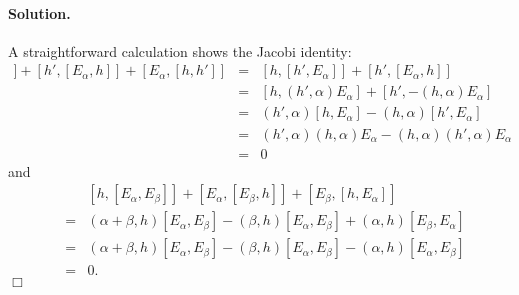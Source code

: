 \documentclass[11pt]{article}
\begin{document}
\paragraph{Solution.} A straightforward calculation shows the Jacobi identity:
\begin{eqnarray*}
[h, [h', E_\alpha]] + [h', [E_\alpha, h]] + [E_\alpha, [h, h']] 
&=& [h, [h', E_\alpha]] + [h', [E_\alpha, h]] \\
&=& [h, (h', \alpha) E_\alpha] + [h', -(h, \alpha) E_\alpha] \\
&=& (h', \alpha)[h, E_\alpha] - (h, \alpha) [h', E_\alpha] \\
&=& (h', \alpha)(h, \alpha) E_\alpha - (h, \alpha)(h', \alpha) E_\alpha \\
&=& 0
\end{eqnarray*}
and
\begin{eqnarray*}
&& [h, [E_\alpha, E_{\beta} ] ] + [E_\alpha, [E_\beta, h]] + 
    [E_\beta, [h, E_\alpha]] \\
&=& (\alpha+\beta, h) [E_\alpha, E_\beta] - (\beta, h)
[E_\alpha, E_\beta] + (\alpha, h) [E_\beta, E_\alpha] \\
&=& (\alpha+\beta, h) [E_\alpha, E_\beta] - (\beta, h)
[E_\alpha, E_\beta] - (\alpha, h) [E_\alpha, E_\beta] \\
&=& 0.
\end{eqnarray*}
$\Box$
\end{document}
